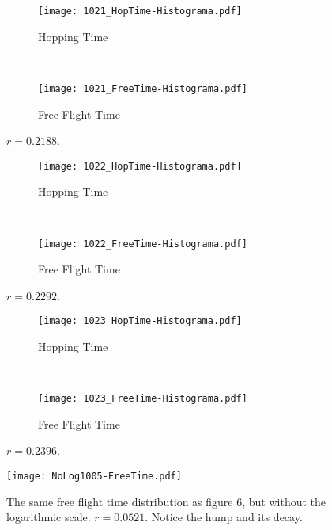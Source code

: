 \documentclass[a4paper,10pt]{article}
\begin{document}
\begin{figure}[h]
        \centering
        \begin{subfigure}[b]{0.45\textwidth}
                \centering
                \texttt{[image: 1021\_HopTime-Histograma.pdf]}
                \caption{Hopping Time}              
        \end{subfigure}%
        ~ %
        \begin{subfigure}[b]{0.45\textwidth}
                \centering
                \texttt{[image: 1021\_FreeTime-Histograma.pdf]}
                \caption{Free Flight Time}                
        \end{subfigure}       
        \caption{ $r=0.2188$. }
\end{figure}




\begin{figure}[h]
        \centering
        \begin{subfigure}[b]{0.45\textwidth}
                \centering
                \texttt{[image: 1022\_HopTime-Histograma.pdf]}
                \caption{Hopping Time}              
        \end{subfigure}%
        ~ %
        \begin{subfigure}[b]{0.45\textwidth}
                \centering
                \texttt{[image: 1022\_FreeTime-Histograma.pdf]}
                \caption{Free Flight Time}                
        \end{subfigure}       
        \caption{ $r=0.2292$. }
\end{figure}

\begin{figure}[h]
        \centering
        \begin{subfigure}[b]{0.45\textwidth}
                \centering
                \texttt{[image: 1023\_HopTime-Histograma.pdf]}
                \caption{Hopping Time}              
        \end{subfigure}%
        ~ %
        \begin{subfigure}[b]{0.45\textwidth}
                \centering
                \texttt{[image: 1023\_FreeTime-Histograma.pdf]}
                \caption{Free Flight Time}                
        \end{subfigure}       
        \caption{ $r=0.2396$. }
\end{figure}

\begin{figure}
 \centering
 \texttt{[image: NoLog1005-FreeTime.pdf]}
 \caption{The same  free flight time distribution as figure 6, but
   without the logarithmic scale. $r=0.0521$. Notice the hump
and its decay.}\label{NotLogPDE}
\end{figure}
\end{document}
